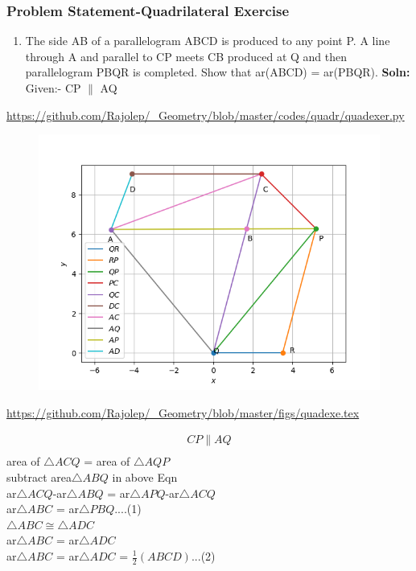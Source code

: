 \begin{frame}
\frametitle{Problem Statement-Quadrilateral Exercise}
\begin{enumerate}[label=(\roman*)]
\item The side AB of a parallelogram ABCD is produced to any point P. A line through A and
parallel to CP meets CB produced at Q and then parallelogram PBQR is completed. Show
that ar(ABCD) = ar(PBQR).
\textbf{Soln:}\\
Given:- CP $\parallel$ AQ
  \end{enumerate} 
\url{https://github.com/Rajolep/_Geometry/blob/master/codes/quadr/quadexer.py}
\begin{figure}
\includegraphics[scale=0.3]{./figs/quadexer.png}
\end{figure}
\end{frame}
\begin{frame}
\begin{figure}

\end{figure}
\url{https://github.com/Rajolep/_Geometry/blob/master/figs/quadexe.tex}
\end{frame}
\begin{frame}
\begin{align*}
CP \parallel AQ\\
\end{align*}
area of $\triangle{ACQ}$ =  area of $\triangle{AQP}$\\
subtract area$\triangle{ABQ}$ in above Eqn\\
ar$\triangle{ACQ}$-ar$\triangle{ABQ}$ = ar$\triangle{APQ}$-ar$\triangle{ACQ}$\\
ar$\triangle{ABC}$ = ar$\triangle{PBQ}$....(1)\\
$\triangle{ABC} \cong \triangle{ADC}$\\
ar$\triangle{ABC}$ = ar$\triangle{ADC}$\\
ar$\triangle{ABC}$ = ar$\triangle{ADC}$ = $\frac{1}{2}(ABCD)$...(2)\\
\end{frame}
